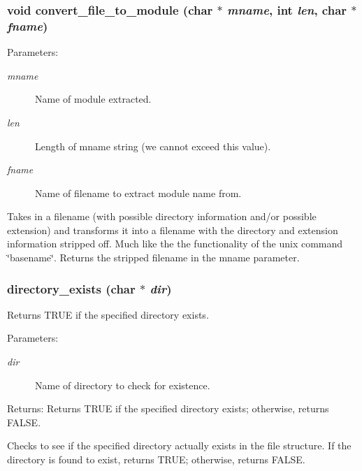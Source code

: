 \subsubsection{\setlength{\rightskip}{0pt plus 5cm}void convert\_\-file\_\-to\_\-module (char $\ast$ {\em mname}, int {\em len}, char $\ast$ {\em fname})}\label{util_8c_a17}


\begin{Desc}
\item[Parameters:]
\begin{description}
\item[{\em mname}]Name of module extracted. \item[{\em len}]Length of mname string (we cannot exceed this value). \item[{\em fname}]Name of filename to extract module name from.\end{description}
\end{Desc}
Takes in a filename (with possible directory information and/or possible extension) and transforms it into a filename with the directory and extension information stripped off. Much like the the functionality of the unix command \char`\"{}basename\char`\"{}. Returns the stripped filename in the mname parameter. 
\subsubsection{ directory\_\-exists (char $\ast$ {\em dir})}\label{util_8c_a10}


Returns TRUE if the specified directory exists.

\begin{Desc}
\item[Parameters:]
\begin{description}
\item[{\em dir}]Name of directory to check for existence. \end{description}
\end{Desc}
\begin{Desc}
\item[Returns:]Returns TRUE if the specified directory exists; otherwise, returns FALSE.\end{Desc}
Checks to see if the specified directory actually exists in the file structure. If the directory is found to exist, returns TRUE; otherwise, returns FALSE. 
